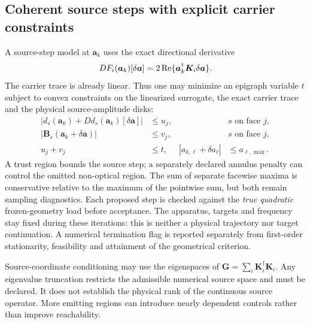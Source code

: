 \subsection{Coherent source steps with explicit carrier constraints}
A source-step model at $\bm a_k$ uses the exact directional derivative
\begin{equation}
 D F_i(\bm a_k)[\delta\bm a]
       =2\operatorname{Re}\{\bm a_k^\dagger\bm K_i\delta\bm a\}.
\end{equation}
The carrier trace is already linear. Thus one may minimize an epigraph
variable $t$ subject to convex constraints on the linearized surrogate,
the exact carrier trace and the physical source-amplitude disks:
\begin{align}
 |d_s(\bm a_k)+D d_s(\bm a_k)[\delta\bm a]|&\leq u_j,
       &&s\text{ on face }j,\\
 |\bm B_s(\bm a_k+\delta\bm a)|&\leq v_j,
       &&s\text{ on face }j,\\
 u_j+v_j&\leq t,&
 |a_{k,\ell}+\delta a_\ell|&\leq a_{\ell,\max}.
\end{align}
A trust region bounds the source step; a separately declared annulus penalty
can control the omitted non-optical region. The sum of separate facewise
maxima is conservative relative to the maximum of the pointwise sum, but both
remain sampling diagnostics. Each proposed step is checked against the
\emph{true quadratic} frozen-geometry load before acceptance. The apparatus,
targets and frequency stay fixed during these iterations: this is neither a
physical trajectory nor target continuation. A numerical termination flag is
reported separately from first-order stationarity, feasibility and attainment
of the geometrical criterion.

Source-coordinate conditioning may use the eigenspaces of
$\bm G=\sum_i\bm K_i^\dagger\bm K_i$. Any eigenvalue truncation restricts the
admissible numerical source space and must be declared. It does not establish
the physical rank of the continuous source operator. More emitting regions
can introduce nearly dependent controls rather than improve reachability.

